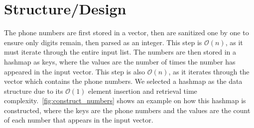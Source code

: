 \documentclass{report}
\begin{document}
\section{Structure/Design}
The phone numbers are first stored in a vector, then are sanitized one by one to ensure only digits remain, then parsed as an integer. This step is \(\mathcal{O}(n)\), as it must iterate through the entire input list. The numbers are then stored in a hashmap as keys, where the values are the number of times the number has appeared in the input vector. This step is also \(\mathcal{O}(n)\), as it iterates through the vector which contains the phone numbers. We selected a hashmap as the data structure due to its \(\mathcal{O}(1)\) element insertion and retrieval time complexity.~\autoref{fig:construct_numbers} shows an example on how this hashmap is constructed, where the keys are the phone numbers and the values are the count of each number that appears in the input vector.
\end{document}

